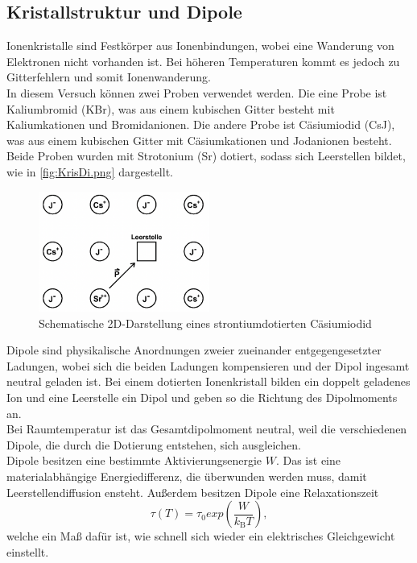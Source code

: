 \subsection{Kristallstruktur und Dipole}
\label{subsec:KriDi}
Ionenkristalle sind Festkörper aus Ionenbindungen, wobei eine Wanderung von Elektronen nicht vorhanden
ist. Bei höheren Temperaturen kommt es jedoch zu Gitterfehlern und somit Ionenwanderung.\\
In diesem Versuch können zwei Proben verwendet werden. Die eine Probe ist Kaliumbromid (KBr), was aus einem kubischen Gitter
besteht mit Kaliumkationen und Bromidanionen. Die andere Probe ist Cäsiumiodid (CsJ), was aus einem kubischen
Gitter mit Cäsiumkationen und Jodanionen besteht. Beide Proben wurden mit Strotonium (Sr) dotiert, sodass sich
Leerstellen bildet, wie in \autoref{fig:KrisDi.png} dargestellt.
\begin{figure}[H]
    \centering
    \includegraphics[width=0.5\textwidth]{Abbildungen/KrisDi.png}
    \caption {Schematische 2D-Darstellung eines strontiumdotierten Cäsiumiodid}
    \label{fig:KrisDi.png}
\end{figure}
Dipole sind physikalische Anordnungen zweier zueinander entgegengesetzter Ladungen, wobei sich die beiden Ladungen
kompensieren und der Dipol ingesamt neutral geladen ist.
Bei einem dotierten Ionenkristall bilden ein doppelt geladenes Ion und eine Leerstelle ein Dipol und geben so die 
Richtung des Dipolmoments an.\\
Bei Raumtemperatur ist das Gesamtdipolmoment neutral, weil die verschiedenen Dipole, die durch die Dotierung 
entstehen, sich ausgleichen.\\
Dipole besitzen eine bestimmte Aktivierungsenergie $W$. Das ist eine materialabhängige Energiedifferenz, die 
überwunden werden muss, damit Leerstellendiffusion ensteht.
Außerdem besitzen Dipole eine Relaxationszeit
\begin{equation}
    \tau(T) = \tau_0 exp(\frac{W}{k_\text{B} T}),
    \label{eqn:Relaxationszeit}
\end{equation}
welche ein Maß dafür ist, wie schnell sich wieder ein elektrisches Gleichgewicht einstellt.\\
